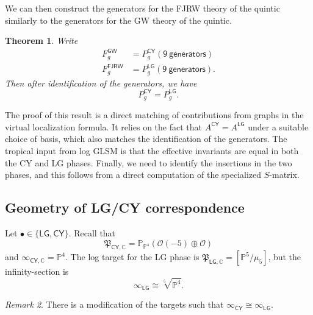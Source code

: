\documentclass[10pt,oldfontcommands,oneside]{memoir}
\newtheorem{thm}{Theorem}[section]
\theoremstyle{definition}
\theoremstyle{remark}
\newtheorem{rmk}[thm]{Remark}
\theoremstyle{plain}
\theoremstyle{definition}
\theoremstyle{remark}
\newcommand{\C}{\mathbb{C}}
\renewcommand{\P}{\mathbb{P}}
\newcommand{\mc}[1]{\mathcal{#1}}
\newcommand{\mf}[1]{\mathfrak{#1}}
\newcommand{\ms}[1]{\mathsf{#1}}
\newcommand{\1}{\mathbf{1}}
\newcommand{\2}{\mathbf{2}}
\newcommand{\3}{\mathbf{3}}
\newcommand{\GW}{\ms{GW}}
\newcommand{\FJRW}{\ms{FJRW}}
\newcommand{\LG}{\ms{LG}}
\newcommand{\CY}{\ms{CY}}
\begin{document}
We can then construct the generators for the FJRW theory of the quintic similarly to the generators for the GW theory of the quintic.
\begin{thm}
    Write
    \begin{align*}
        F_g^{\GW} &= P_g^{\ms{CY}} (\ms{9\ generators}) \\
        F_g^{\FJRW} &= P_g^{\LG}(\ms{9\ generators}).
    \end{align*}
    Then after identification of the generators, we have
    \[ P_g^{\ms{CY}} = P_g^{\LG}. \]
\end{thm}

The proof of this result is a direct matching of contributions from graphs in the virtual localization formula. It relies on the fact that $A^{\ms{CY}} = A^{\ms{LG}}$ under a suitable choice of basis, which also matches the identification of the generators. The tropical input from log GLSM is that the effective invariants are equal in both the CY and LG phases. Finally, we need to identify the insertions in the two phases, and this follows from a direct computation of the specialized $S$-matrix.

\subsection{Geometry of LG/CY correspondence}%
\label{sub:Geometry of LG/CY correspondence}

Let $\bullet \in \{\LG,\CY\}$. Recall that
\[ \mf{P}_{\CY, \C} = \P_{\P^4}(\mc{O}(-5) \oplus \mc{O}) \]
and $\infty_{\CY, \C} = \P^4$. The log target for the LG phase is $\mf{P}_{\LG, \C} = [\P^5/\mu_5]$, but the infinity-section is
\[ \infty_{\LG} \cong \sqrt[5]{\P^4}. \]

\begin{rmk}
    There is a modification of the targets such that $\infty_{\CY} \cong \infty_{\LG}$.
\end{rmk}
\end{document}
